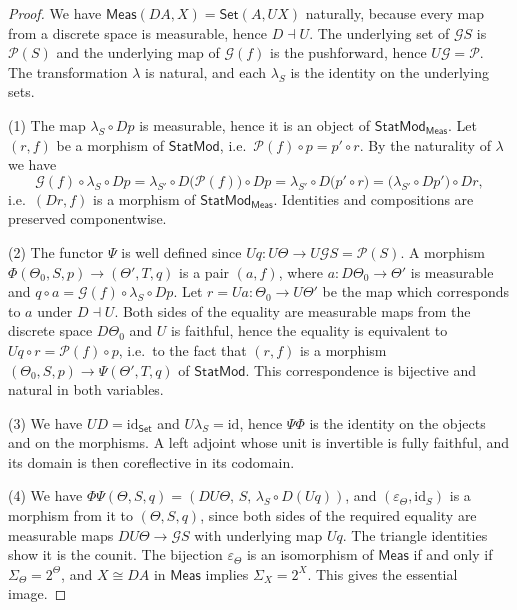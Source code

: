 \documentclass[11pt,a4paper]{article}
\theoremstyle{plain}
\theoremstyle{definition}
\theoremstyle{remark}
\newcommand{\cat}[1]{\mathsf{#1}}
\newcommand{\Meas}{\cat{Meas}}
\newcommand{\Set}{\cat{Set}}
\newcommand{\G}{\mathcal{G}}
\newcommand{\Prb}{\mathcal{P}}
\newcommand{\id}{\mathrm{id}}
\newcommand{\StatMod}{\cat{StatMod}}
\newcommand{\Statk}{\StatMod_{\Meas}}
\begin{document}
\begin{proof}
We have $\Meas(DA, X) = \Set(A, UX)$ naturally, because every map from a
discrete space is measurable, hence $D \dashv U$. The underlying set of $\G S$
is $\Prb(S)$ and the underlying map of $\G(f)$ is the pushforward, hence
$U\G = \Prb$. The transformation $\lambda$ is natural, and each $\lambda_S$ is
the identity on the underlying sets.

(1) The map $\lambda_S \circ Dp$ is measurable, hence it is an object of
$\Statk$. Let $(r,f)$ be a morphism of $\StatMod$, i.e.\
$\Prb(f)\circ p = p' \circ r$. By the naturality of $\lambda$ we have
\[
\G(f) \circ \lambda_S \circ Dp
= \lambda_{S'} \circ D\bigl(\Prb(f)\bigr) \circ Dp
= \lambda_{S'} \circ D\bigl(p' \circ r\bigr)
= \bigl(\lambda_{S'} \circ Dp'\bigr) \circ Dr ,
\]
i.e.\ $(Dr,f)$ is a morphism of $\Statk$. Identities and compositions are
preserved componentwise.

(2) The functor $\Psi$ is well defined since
$Uq \colon U\Theta \to U\G S = \Prb(S)$. A morphism
$\Phi(\Theta_0,S,p) \to (\Theta',T,q)$ is a pair $(a,f)$, where
$a \colon D\Theta_0 \to \Theta'$ is measurable and
$q \circ a = \G(f) \circ \lambda_S \circ Dp$. Let
$r = Ua \colon \Theta_0 \to U\Theta'$ be the map which corresponds to $a$ under
$D \dashv U$. Both sides of the equality are measurable maps from the discrete
space $D\Theta_0$ and $U$ is faithful, hence the equality is equivalent to
$Uq \circ r = \Prb(f) \circ p$, i.e.\ to the fact that $(r,f)$ is a morphism
$(\Theta_0,S,p) \to \Psi(\Theta',T,q)$ of $\StatMod$. This correspondence is
bijective and natural in both variables.

(3) We have $UD = \id_{\Set}$ and $U\lambda_S = \id$, hence $\Psi\Phi$ is the
identity on the objects and on the morphisms. A left adjoint whose unit is
invertible is fully faithful, and its domain is then coreflective in its
codomain.

(4) We have
$\Phi\Psi(\Theta,S,q) = (DU\Theta,\, S,\, \lambda_S \circ D(Uq))$, and
$(\varepsilon_\Theta, \id_S)$ is a morphism from it to $(\Theta,S,q)$, since
both sides of the required equality are measurable maps $DU\Theta \to \G S$
with underlying map $Uq$. The triangle identities show it is the counit. The
bijection $\varepsilon_\Theta$ is an isomorphism of $\Meas$ if and only if
$\Sigma_\Theta = 2^{\Theta}$, and $X \cong DA$ in $\Meas$ implies
$\Sigma_X = 2^X$. This gives the essential image.
\end{proof}
\end{document}
